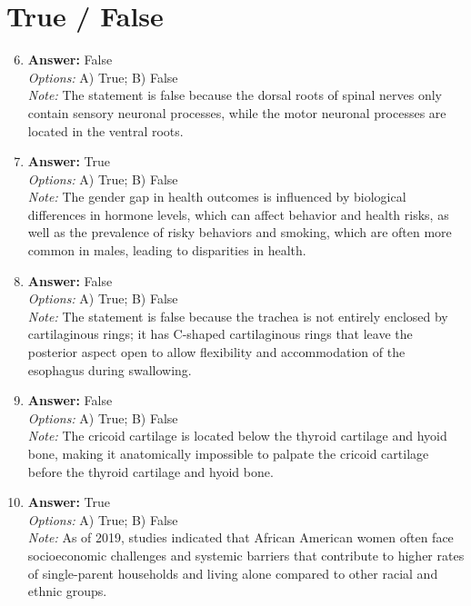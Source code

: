 \documentclass[12pt]{article}
\begin{document}
\section*{True / False}
\begin{enumerate}[label=\arabic*.]
\setcounter{enumi}{5}
\item \textbf{Answer:} False
\\ \textit{Options:} A) True; B) False
\\ \textit{Note:} The statement is false because the dorsal roots of spinal nerves only contain sensory neuronal processes, while the motor neuronal processes are located in the ventral roots.
\item \textbf{Answer:} True
\\ \textit{Options:} A) True; B) False
\\ \textit{Note:} The gender gap in health outcomes is influenced by biological differences in hormone levels, which can affect behavior and health risks, as well as the prevalence of risky behaviors and smoking, which are often more common in males, leading to disparities in health.
\item \textbf{Answer:} False
\\ \textit{Options:} A) True; B) False
\\ \textit{Note:} The statement is false because the trachea is not entirely enclosed by cartilaginous rings; it has C-shaped cartilaginous rings that leave the posterior aspect open to allow flexibility and accommodation of the esophagus during swallowing.
\item \textbf{Answer:} False
\\ \textit{Options:} A) True; B) False
\\ \textit{Note:} The cricoid cartilage is located below the thyroid cartilage and hyoid bone, making it anatomically impossible to palpate the cricoid cartilage before the thyroid cartilage and hyoid bone.
\item \textbf{Answer:} True
\\ \textit{Options:} A) True; B) False
\\ \textit{Note:} As of 2019, studies indicated that African American women often face socioeconomic challenges and systemic barriers that contribute to higher rates of single-parent households and living alone compared to other racial and ethnic groups.
\end{enumerate}
\end{document}
